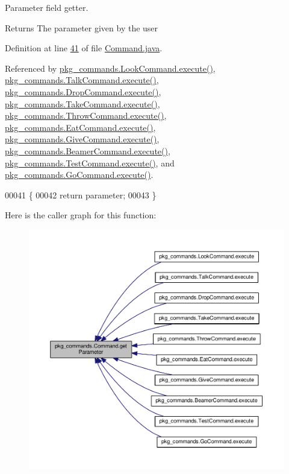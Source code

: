 Parameter field getter. 

\begin{DoxyReturn}{Returns}
The parameter given by the user 
\end{DoxyReturn}


Definition at line \hyperlink{Command_8java_source_l00041}{41} of file \hyperlink{Command_8java_source}{Command.\-java}.



Referenced by \hyperlink{LookCommand_8java_source_l00026}{pkg\-\_\-commands.\-Look\-Command.\-execute()}, \hyperlink{TalkCommand_8java_source_l00027}{pkg\-\_\-commands.\-Talk\-Command.\-execute()}, \hyperlink{DropCommand_8java_source_l00027}{pkg\-\_\-commands.\-Drop\-Command.\-execute()}, \hyperlink{TakeCommand_8java_source_l00027}{pkg\-\_\-commands.\-Take\-Command.\-execute()}, \hyperlink{ThrowCommand_8java_source_l00028}{pkg\-\_\-commands.\-Throw\-Command.\-execute()}, \hyperlink{EatCommand_8java_source_l00028}{pkg\-\_\-commands.\-Eat\-Command.\-execute()}, \hyperlink{GiveCommand_8java_source_l00029}{pkg\-\_\-commands.\-Give\-Command.\-execute()}, \hyperlink{BeamerCommand_8java_source_l00030}{pkg\-\_\-commands.\-Beamer\-Command.\-execute()}, \hyperlink{TestCommand_8java_source_l00032}{pkg\-\_\-commands.\-Test\-Command.\-execute()}, and \hyperlink{GoCommand_8java_source_l00032}{pkg\-\_\-commands.\-Go\-Command.\-execute()}.


\begin{DoxyCode}
00041                                  \{
00042         \textcolor{keywordflow}{return} parameter;
00043     \}
\end{DoxyCode}


Here is the caller graph for this function\-:
\nopagebreak
\begin{figure}[H]
\begin{center}
\leavevmode
\includegraphics[width=350pt]{classpkg__commands_1_1Command_a41c92d445be73ea9d62320c65efb8434_icgraph}
\end{center}
\end{figure}


